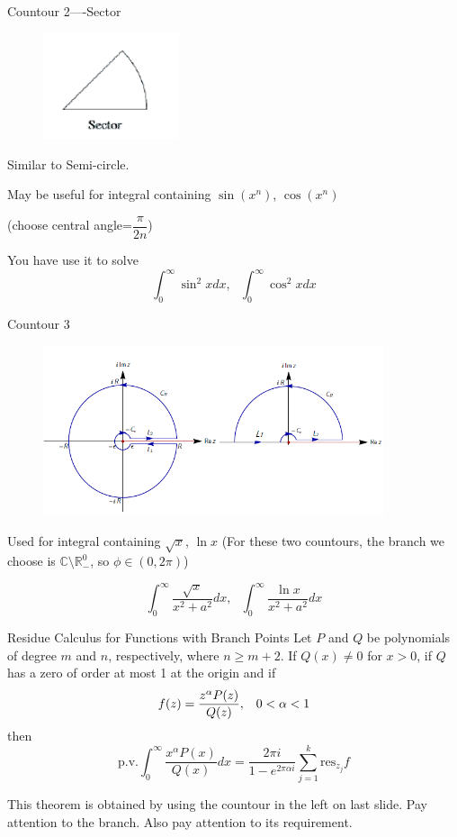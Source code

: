 \documentclass{beamer}
\begin{document}
\begin{frame}
\begin{block}{Countour 2----Sector}
\begin{figure}[h]
    \centering
    \includegraphics[width=4cm]{sector.png}
\end{figure}
Similar to Semi-circle.

May be useful for integral containing $\sin(x^n)$, $\cos(x^n)$ 

(choose central angle=$\dfrac{\pi}{2n}$) 

You have use it to solve 
$$\int_0^{\infty}\sin^2xdx,\,\,\,\,\int_{0}^{\infty}\cos^2xdx$$
\end{block}
\end{frame}

\begin{frame}
\begin{block}{Countour 3}
\begin{figure}[h]
    \centering
    \includegraphics[width=10cm]{branch.png}
\end{figure}

Used for integral containing $\sqrt{x}$, $\ln x$ (For these two countours, the branch we choose is $\mathbb{C}\setminus\mathbb{R}^0_-$, so $\phi\in(0,2\pi)$)

$$\int_0^{\infty}\dfrac{\sqrt{x}}{x^2+a^2}dx,\,\,\,\,\int_{0}^{\infty}\dfrac{\ln x}{x^2+a^2}dx$$
\end{block}
\end{frame}


\begin{frame}
\begin{block}{Residue Calculus for Functions with Branch Points}
Let $P$ and $Q$ be polynomials of degree $m$ and $n$, respectively, where $n\geqslant m+2$. If $Q(x)\neq0$ for $x>0$, if $Q$ has a zero of order at most 1 at the origin and if
$$f(z)=\dfrac{z^{\alpha}P(z)}{Q(z)},\hspace{3mm}0<\alpha<1$$
then
$$\text{p.v.}\int_0^{\infty}\dfrac{x^{\alpha}P(x)}{Q(x)}dx=\dfrac{2\pi i}{1-e^{2\pi \alpha i}}\sum\limits_{j=1}^k\text{res}_{z_j}f$$
\end{block}
This theorem is obtained by using the countour in the left on last slide. Pay attention to the branch. Also pay attention to its requirement. 
\end{frame}
\end{document}
